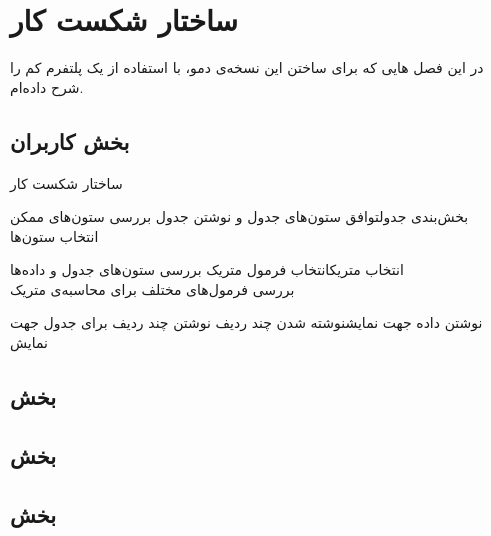 \chapter{ساختار شکست کار}
در این فصل 
هایی
که برای ساختن این نسخه‌ی دمو، با استفاده از یک پلتفرم کم را شرح داده‌ام.

\section{بخش کاربران}
\begin{wbsbox}{ساختار شکست کار}
\begin{wbssub}{بخش‌بندی جدول}{توافق ستون‌های جدول و نوشتن جدول}
\task بررسی ستون‌های ممکن \\
\task انتخاب ستون‌ها
\end{wbssub}

\begin{wbssub}{انتخاب متریک}{انتخاب فرمول متریک}
\task بررسی ستون‌های جدول و داده‌ها\\
\task بررسی فرمول‌های مختلف ‌برای محاسبه‌ی متریک
\end{wbssub}

\begin{wbssub}{نوشتن داده جهت نمایش}{نوشته شدن چند ردیف}
\task نوشتن چند ردیف برای جدول جهت نمایش
\end{wbssub}
\end{wbsbox}

\section{بخش }
\section{بخش }
\section{بخش }
